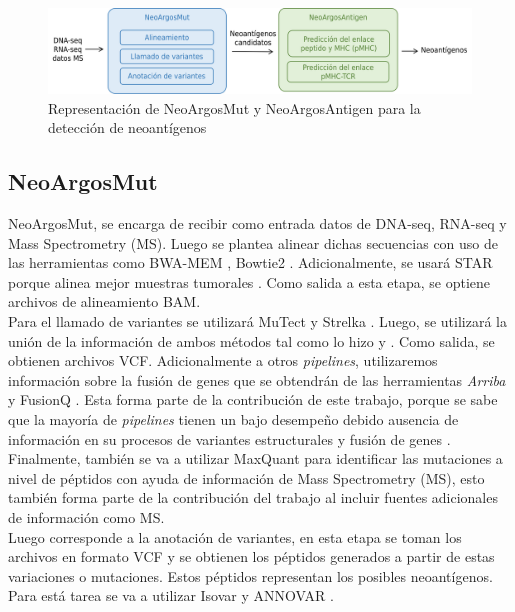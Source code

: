 \documentclass[a4paper]{article}
\begin{document}
\begin{figure}[h]	
		\centering
		\includegraphics[width=\textwidth]{../img/pipeline/proposal_pipeline}	
	\caption{Representación de NeoArgosMut y NeoArgosAntigen para la detección de neoantígenos}
	\label{fig:pipeline}
\end{figure}


\subsection{NeoArgosMut}

NeoArgosMut, se encarga de recibir como entrada datos de DNA-seq, RNA-seq y Mass Spectrometry (MS). Luego se plantea alinear dichas secuencias con uso de las herramientas como BWA-MEM \citep{li2013aligning}, Bowtie2 \citep{langmead2012fast}. Adicionalmente, se usará STAR \citep{dobin2013star} porque alinea mejor muestras tumorales \citep{rubinsteyn2018computational}. Como salida a esta etapa, se optiene archivos de alineamiento BAM.\\

Para el llamado de variantes se utilizará MuTect \citep{cibulskis2013sensitive} y Strelka \citep{saunders2012strelka}. Luego, se utilizará la unión de la información de ambos métodos tal como lo hizo \cite{zhou2023prioritizing} y \cite{rubinsteyn2018computational}. Como salida, se obtienen archivos VCF. Adicionalmente a otros \textit{pipelines}, utilizaremos información sobre la fusión de genes que se obtendrán de las herramientas \textit{Arriba} \citep{uhrig2021accurate} y FusionQ \citep{liu2013fusionq}. Esta forma parte de la contribución de este trabajo, porque se sabe que la mayoría de \textit{pipelines} tienen un bajo desempeño debido ausencia de información en su procesos de variantes estructurales y fusión de genes \citep{wood2020neoepiscope}. Finalmente, también se va a utilizar MaxQuant \citep{cox2008maxquant} para identificar las mutaciones a nivel de péptidos con ayuda de información de Mass Spectrometry (MS), esto también forma parte de la contribución del trabajo al incluir fuentes adicionales de información como MS.\\



Luego corresponde a la anotación de variantes, en esta etapa se toman los archivos en formato VCF y se obtienen los péptidos generados a partir de estas variaciones o mutaciones. Estos péptidos representan los posibles neoantígenos. Para está tarea se va a utilizar Isovar y ANNOVAR \citep{wang2010annovar}. \\
\end{document}
